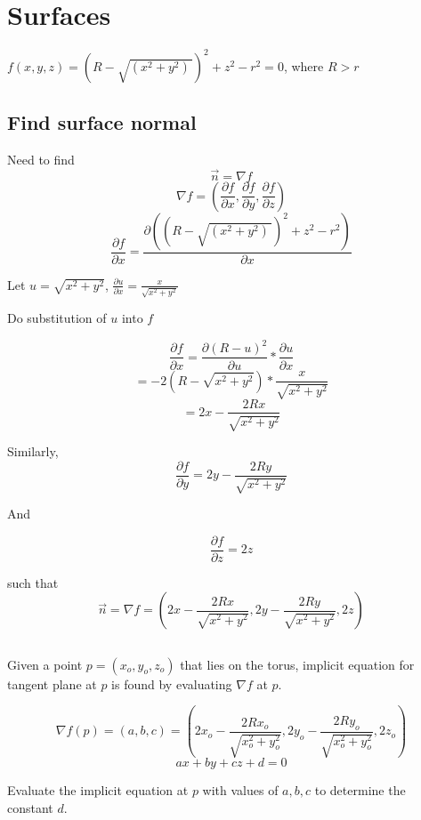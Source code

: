 \documentclass[a4paper,10pt]{scrartcl}
\begin{document}
\section{Surfaces}

$f(x,y,z) = (R - \sqrt{(x^2 + y^2) \,})^2 + z^2 - r^2 = 0$, where $ R > r$

\subsection{Find surface normal}


Need to find \[ \vec n = \nabla f\]
\[ \nabla f = ( \frac{\partial f}{\partial x}, \frac{\partial f}{\partial y}, \frac{\partial f}{\partial z})\]
\[ \frac{\partial f}{\partial x} = \frac{\partial ((R - \sqrt{(x^2 + y^2) \,})^2 + z^2 - r^2)}{\partial x}\]

Let $u = \sqrt{x ^2 + y^2}$, $\frac{\partial u}{\partial x} = \frac{x}{\sqrt{x ^2 + y^2}}$

Do substitution of $u$ into $f$

\[ \frac{\partial f}{\partial x} = \frac{\partial (R - u)^2}{\partial u} * \frac{\partial u}{\partial x}\]
\[ = -2 (R - \sqrt{x^2 + y^2}) * \frac{x}{\sqrt{x^2 + y^2}}\]
\[ = 2x - \frac{2Rx}{\sqrt{x^2+y^2}}\]

Similarly, 
\[\frac{\partial f}{\partial y} = 2y - \frac{2Ry}{\sqrt{x^2+y^2}}\]

And

\[\frac{\partial f}{\partial z} = 2z\]

such that \[ \vec n = \nabla f = (2x - \frac{2Rx}{\sqrt{x^2+y^2}}, 2y - \frac{2Ry}{\sqrt{x^2+y^2}}, 2z)\]

% 
% 

\subsection{}

Given a point $p = (x_o, y_o, z_o)$ that lies on the torus, implicit equation for tangent plane at $p$ is found by evaluating
$\nabla f $ at $p$.

\[ \nabla f(p) = (a,b,c) = (2x_o - \frac{2Rx_o}{\sqrt{x_o^2+y_o^2}}, 2y_o - \frac{2Ry_o}{\sqrt{x_o^2+y_o^2}}, 2z_o) \]
\[ ax + by + cz + d = 0\]

Evaluate the implicit equation at $p$ with values of $a, b, c$ to determine the constant $d$.
\end{document}
